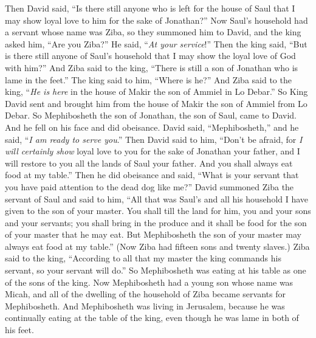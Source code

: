 \begin{biblechapter} %
 Then David said, “Is there still anyone who is left for the house of Saul that I may show loyal love to him for the sake of Jonathan?”
\verse Now Saul’s household had a servant whose name was Ziba, so they summoned him to David, and the king asked him, “Are you Ziba?” He said, “\textit{At your service}!”
\verse Then the king said, “But is there still anyone of Saul’s household that I may show the loyal love of God with him?” And Ziba said to the king, “There is still a son of Jonathan who is lame in the feet.”
\verse The king said to him, “Where is he?” And Ziba said to the king, “\textit{He is here} in the house of Makir the son of Ammiel in Lo Debar.”
\verse So King David sent and brought him from the house of Makir the son of Ammiel from Lo Debar.
\verse So Mephibosheth the son of Jonathan, the son of Saul, came to David. And he fell on his face and did obeisance. David said, “Mephibosheth,” and he said, “\textit{I am ready to serve you}.”
\verse Then David said to him, “Don’t be afraid, for \textit{I will certainly show} loyal love to you for the sake of Jonathan your father, and I will restore to you all the lands of Saul your father. And you shall always eat food at my table.”
\verse Then he did obeisance and said, “What is your servant that you have paid attention to the dead dog like me?”
\verse David summoned Ziba the servant of Saul and said to him, “All that was Saul’s and all his household I have given to the son of your master.
\verse You shall till the land for him, you and your sons and your servants; you shall bring in the produce and it shall be food for the son of your master that he may eat. But Mephibosheth the son of your master may always eat food at my table.” (Now Ziba had fifteen sons and twenty slaves.)
\verse Ziba said to the king, “According to all that my master the king commands his servant, so your servant will do.” So Mephibosheth was eating at his table as one of the sons of the king.
\verse Now Mephibosheth had a young son whose name was Micah, and all of the dwelling of the household of Ziba became servants for Mephibosheth.
\verse And Mephibosheth was living in Jerusalem, because he was continually eating at the table of the king, even though he was lame in both of his feet.
\end{biblechapter}


